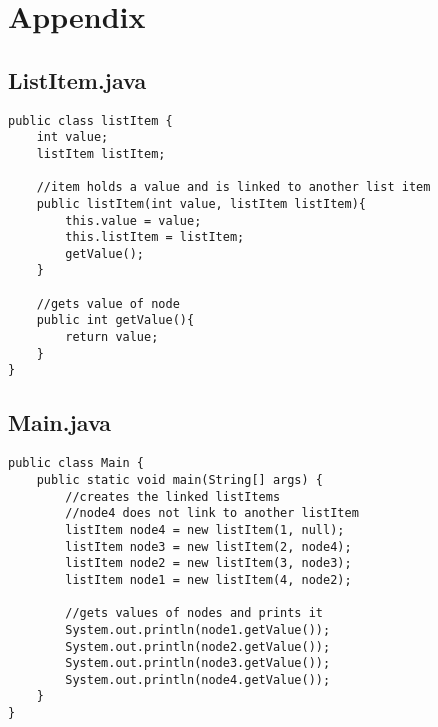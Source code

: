 \documentclass[10pt]{article}
\begin{document}
\pagebreak


\section{Appendix}

\subsection{ListItem.java}

\lstset{numbers=left, numberstyle=\tiny, stepnumber=1, numbersep=5pt, basicstyle=\footnotesize\ttfamily}
\begin{lstlisting}[frame=single, ]  
public class listItem {
    int value;
    listItem listItem;

    //item holds a value and is linked to another list item
    public listItem(int value, listItem listItem){
        this.value = value;
        this.listItem = listItem;
        getValue();
    }

    //gets value of node
    public int getValue(){
        return value;
    }
}
\end{lstlisting}

\subsection{Main.java}

\lstset{numbers=left, numberstyle=\tiny, stepnumber=1, numbersep=5pt, basicstyle=\footnotesize\ttfamily}
\begin{lstlisting}[frame=single, ]  
public class Main {
    public static void main(String[] args) {
        //creates the linked listItems
        //node4 does not link to another listItem
        listItem node4 = new listItem(1, null);
        listItem node3 = new listItem(2, node4);
        listItem node2 = new listItem(3, node3);
        listItem node1 = new listItem(4, node2);

        //gets values of nodes and prints it
        System.out.println(node1.getValue());
        System.out.println(node2.getValue());
        System.out.println(node3.getValue());
        System.out.println(node4.getValue());
    }
}   
\end{lstlisting}
\end{document}
